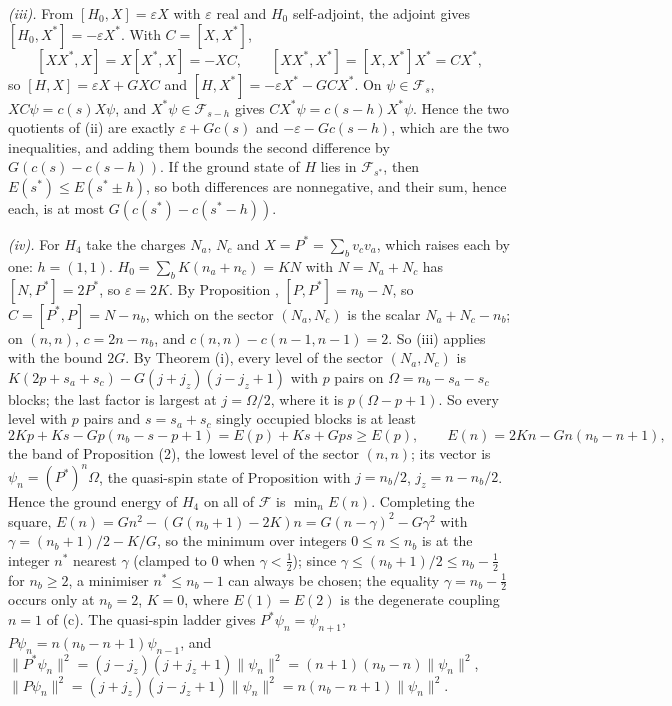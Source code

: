 \emph{(iii).} From $[H_{0}, X] = \varepsilon X$ with $\varepsilon$ real and $H_{0}$ self-adjoint, the adjoint gives $[H_{0}, X^{*}] = -\varepsilon X^{*}$. With $C = [X, X^{*}]$,
\[
[XX^{*}, X] = X[X^{*}, X] = -XC, \qquad [XX^{*}, X^{*}] = [X, X^{*}]X^{*} = CX^{*},
\]
so $[H, X] = \varepsilon X + GXC$ and $[H, X^{*}] = -\varepsilon X^{*} - GCX^{*}$. On $\psi \in \mathcal{F}_{s}$, $XC\psi = c(s)X\psi$, and $X^{*}\psi \in \mathcal{F}_{s-h}$ gives $CX^{*}\psi = c(s - h)X^{*}\psi$. Hence the two quotients of (ii) are exactly $\varepsilon + Gc(s)$ and $-\varepsilon - Gc(s - h)$, which are the two inequalities, and adding them bounds the second difference by $G(c(s) - c(s - h))$. If the ground state of $H$ lies in $\mathcal{F}_{s^{*}}$, then $E(s^{*}) \le E(s^{*} \pm h)$, so both differences are nonnegative, and their sum, hence each, is at most $G(c(s^{*}) - c(s^{*} - h))$.

\emph{(iv).} For $H_{4}$ take the charges $N_{a}$, $N_{c}$ and $X = P^{*} = \sum_{b}v_{c}v_{a}$, which raises each by one: $h = (1, 1)$. $H_{0} = \sum_{b}K(n_{a} + n_{c}) = KN$ with $N = N_{a} + N_{c}$ has $[N, P^{*}] = 2P^{*}$, so $\varepsilon = 2K$. By Proposition , $[P, P^{*}] = n_{b} - N$, so $C = [P^{*}, P] = N - n_{b}$, which on the sector $(N_{a}, N_{c})$ is the scalar $N_{a} + N_{c} - n_{b}$; on $(n, n)$, $c = 2n - n_{b}$, and $c(n, n) - c(n - 1, n - 1) = 2$. So (iii) applies with the bound $2G$. By Theorem (i), every level of the sector $(N_{a}, N_{c})$ is $K(2p + s_{a} + s_{c}) - G(j + j_{z})(j - j_{z} + 1)$ with $p$ pairs on $\Omega = n_{b} - s_{a} - s_{c}$ blocks; the last factor is largest at $j = \Omega/2$, where it is $p(\Omega - p + 1)$. So every level with $p$ pairs and $s = s_{a} + s_{c}$ singly occupied blocks is at least
\[
2Kp + Ks - Gp(n_{b} - s - p + 1) = E(p) + Ks + Gps \ge E(p), \qquad E(n) = 2Kn - Gn(n_{b} - n + 1),
\]
the band of Proposition (2), the lowest level of the sector $(n, n)$; its vector is $\psi_{n} = (P^{*})^{n}\Omega$, the quasi-spin state of Proposition  with $j = n_{b}/2$, $j_{z} = n - n_{b}/2$. Hence the ground energy of $H_{4}$ on all of $\mathcal{F}$ is $\min_{n}E(n)$. Completing the square, $E(n) = Gn^{2} - (G(n_{b} + 1) - 2K)n = G(n - \gamma)^{2} - G\gamma^{2}$ with $\gamma = (n_{b} + 1)/2 - K/G$, so the minimum over integers $0 \le n \le n_{b}$ is at the integer $n^{*}$ nearest $\gamma$ (clamped to $0$ when $\gamma < \tfrac12$); since $\gamma \le (n_{b} + 1)/2 \le n_{b} - \tfrac12$ for $n_{b} \ge 2$, a minimiser $n^{*} \le n_{b} - 1$ can always be chosen; the equality $\gamma = n_{b} - \tfrac12$ occurs only at $n_{b} = 2$, $K = 0$, where $E(1) = E(2)$ is the degenerate coupling $n = 1$ of (c). The quasi-spin ladder gives $P^{*}\psi_{n} = \psi_{n+1}$, $P\psi_{n} = n(n_{b} - n + 1)\psi_{n-1}$, and $\|P^{*}\psi_{n}\|^{2} = (j - j_{z})(j + j_{z} + 1)\|\psi_{n}\|^{2} = (n + 1)(n_{b} - n)\|\psi_{n}\|^{2}$, $\|P\psi_{n}\|^{2} = (j + j_{z})(j - j_{z} + 1)\|\psi_{n}\|^{2} = n(n_{b} - n + 1)\|\psi_{n}\|^{2}$.

